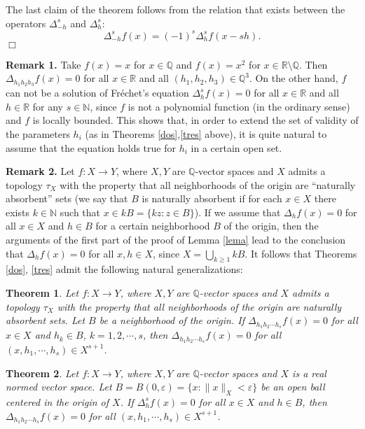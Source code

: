 \documentclass[12pt,a4paper]{amsart}
\newtheorem{theorem}{Theorem}[section]
\theoremstyle{definition}
\begin{document}
The last claim of the theorem follows from the relation that exists between the operators $\Delta_{-h}^s$ and $\Delta_h^s$:
\[
\Delta_{-h}^sf(x)=(-1)^s\Delta_{h}^sf(x-sh).
\]
{\hfill $\Box$}

\noindent \textbf{Remark 1.} Take $f(x)=x$ for $x\in\mathbb{Q}$ and $f(x)=x^2$ for $x\in\mathbb{R}\setminus \mathbb{Q}$. Then $\Delta_{h_1h_2h_3}f(x)=0$ for all $x\in\mathbb{R}$ and all $(h_1,h_2,h_3)\in\mathbb{Q}^3$. On the other hand, $f$ can not be a solution of Fr\'{e}chet's equation $\Delta_h^sf(x)=0$ for all $x\in\mathbb{R}$ and all $h\in\mathbb{R}$ for any $s\in\mathbb{N}$, since $f$ is not a polynomial function (in the ordinary sense) and $f$ is locally bounded. This shows that, in order to extend the set of validity of the parameters $h_i$ (as in Theorems \ref{dos},\ref{tres} above), it is quite natural to assume that the equation holds true for $h_i$ in a certain open set.
\medskip

\noindent \textbf{Remark 2.} Let $f:X\to Y$, where $X, Y$ are $\mathbb{Q}$-vector spaces and $X$ admits a topology $\tau_X$ with the property that all neighborhoods of the origin are ``naturally absorbent'' sets (we say that $B$ is naturally absorbent if for each $x\in X$ there exists $k\in\mathbb{N}$ such that $x\in kB=\{kz:z\in B\}$). If we assume that $\Delta_hf(x)=0$ for all
$x\in X$ and $h\in B$ for a certain neighborhood $B$ of the origin, then the arguments of the first part of the proof of Lemma \ref{lema} lead to the conclusion that $\Delta_hf(x)=0$ for all $x,h\in X$, since $X=\bigcup_{k\geq 1}kB$. It follows that Theorems \ref{dos}, \ref{tres} admit the following natural generalizations:

\begin{theorem}\label{cuatro} Let $f:X\to Y$, where $X, Y$ are $\mathbb{Q}$-vector spaces and $X$ admits a topology $\tau_X$ with the property that all neighborhoods of the origin are naturally absorbent sets. Let  $B$ be  a neighborhood of the origin.  If $\Delta_{h_1h_2\cdots h_s}f(x)=0$ for all $x\in X$ and $h_k\in B$, $k=1,2,\cdots,s$, then $\Delta_{h_1h_2\cdots h_s}f(x)=0$ for all $(x,h_1,\cdots,h_s)\in X^{s+1}$.
\end{theorem}

\begin{theorem}\label{cinco} Let $f:X\to Y$, where $X, Y$ are $\mathbb{Q}$-vector spaces and $X$ is a real normed vector space. Let  $B=B(0,\varepsilon)=\{x:\|x\|_X<\varepsilon\}$ be  an open ball centered in the origin of $X$. If $\Delta_{h}^sf(x)=0$ for all $x\in X$ and $h\in B$, then $\Delta_{h_1h_2\cdots h_s}f(x)=0$ for all $(x,h_1,\cdots,h_s)\in X^{s+1}$.
\end{theorem}
\end{document}
